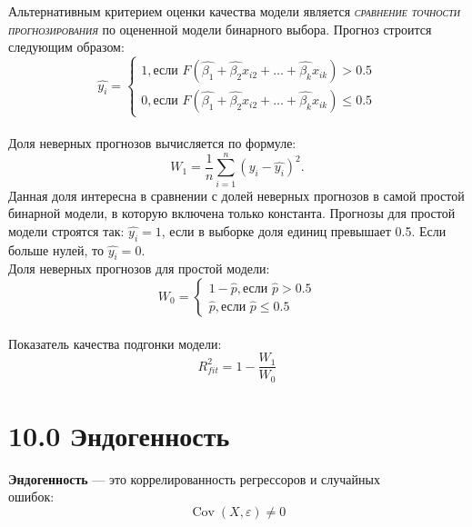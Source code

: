 \documentclass[a0,final]{a0poster}
\DeclareMathOperator{\Cov}{Cov}
\begin{document}
\begin{multicols}{4}
Альтернативным критерием оценки качества модели является \textsc{\textit{сравнение точности прогнозирования}} по оцененной модели бинарного выбора. Прогноз строится следующим образом:\\
\begin{equation*}
\hat{y_i} =
 \begin{cases}
   1, \text{если } F(\hat{\beta_1} + \hat{\beta_2}x_{i2} + \ldots + \hat{\beta_k}x_{ik}) > 0.5\\
   0, \text{если } F(\hat{\beta_1} + \hat{\beta_2}x_{i2} + \ldots + \hat{\beta_k}x_{ik}) \leq 0.5
 \end{cases}
\end{equation*}
\\
Доля неверных прогнозов вычисляется по формуле:\\
\[W_1 = \frac{1}{n}\sum\limits_{i=1}^n (y_i - \hat{y_i})^2.\]
Данная доля интересна в сравнении с долей неверных прогнозов в самой простой бинарной модели, в которую включена только константа. Прогнозы для простой модели строятся так: $\hat{y_i} = 1$, если в выборке доля единиц превышает 0.5. Если больше нулей, то $\hat{y_i} = 0$.\\
Доля неверных прогнозов для простой модели:\\
\begin{equation*}
W_0 =
 \begin{cases}
 1 - \hat{p}, \text{если } \hat{p} > 0.5\\
 \hat{p}, \text{если } \hat{p} \leq 0.5
 \end{cases}
\end{equation*}
\\
Показатель качества подгонки модели:\\
\[R^2_{fit} = 1 - \frac{W_1}{W_0}\]

\section*{10.0 Эндогенность}
\begin{tcolorbox}[colback=red!5!white,colframe=red!75!black]
\textbf{Эндогенность} — это коррелированность регрессоров и случайных\\ ошибок: \[\Cov(X,\varepsilon) \ne 0\]
\end{tcolorbox}


\end{multicols}
\end{document}
